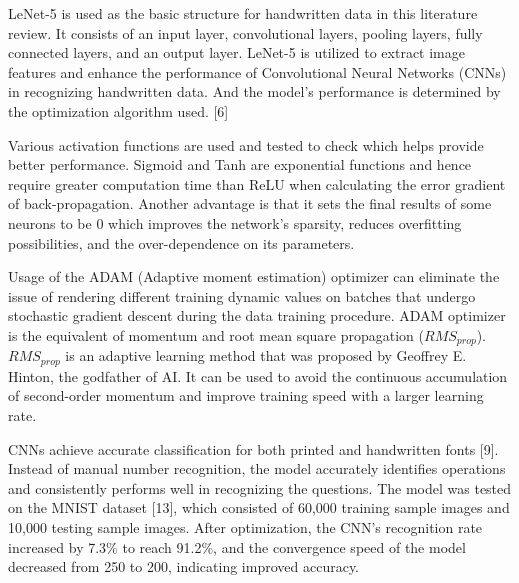 \par
\setlength{\parskip}{3ex}

\noindent
LeNet-5 is used as the basic structure for handwritten data in this literature review. It consists of an input layer, convolutional layers, pooling layers, fully connected layers, and an output layer. LeNet-5 is utilized to extract image features and enhance the performance of Convolutional Neural Networks (CNNs) in recognizing handwritten data. And the model's performance is determined by the optimization algorithm used. [6]

\noindent 
Various activation functions are used and tested to check which helps provide better performance. Sigmoid and Tanh are exponential functions and hence require greater computation time than ReLU when calculating the error gradient of back-propagation. Another advantage is that it sets the final results of some neurons to be 0 which improves the network's sparsity, reduces overfitting possibilities, and the over-dependence on its parameters.
\par

\noindent
Usage of the ADAM (Adaptive moment estimation) optimizer can eliminate the issue of rendering different training dynamic values on batches that undergo stochastic gradient descent during the data training procedure. ADAM optimizer is the equivalent of momentum and root mean square propagation ($RMS_{prop}$). $RMS_{prop}$  is an adaptive learning method that was proposed by Geoffrey E. Hinton, the godfather of AI. It can be used to avoid the continuous accumulation of second-order momentum and improve training speed with a larger learning rate.

\noindent
CNNs achieve accurate classification for both printed and handwritten fonts [9]. Instead of manual number recognition, the model accurately identifies operations and consistently performs well in recognizing the questions. The model was tested on the MNIST dataset [13], which consisted of 60,000 training sample images and 10,000 testing sample images. After optimization, the CNN's recognition rate increased by 7.3\% to reach 91.2\%, and the convergence speed of the model decreased from 250 to 200, indicating improved accuracy.



